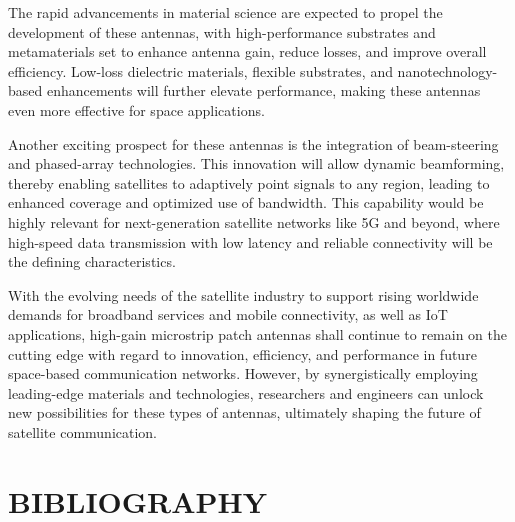 \documentclass[12pt]{article}
\begin{document}
\par The rapid advancements in material science are expected to propel the development of these antennas, with high-performance substrates and metamaterials set to enhance antenna gain, reduce losses, and improve overall efficiency. Low-loss dielectric materials, flexible substrates, and nanotechnology-based enhancements will further elevate performance, making these antennas even more effective for space applications.\\

\newpage
\par Another exciting prospect for these antennas is the integration of beam-steering and phased-array technologies. This innovation will allow dynamic beamforming, thereby enabling satellites to adaptively point signals to any region, leading to enhanced coverage and optimized use of bandwidth. This capability would be highly relevant for next-generation satellite networks like 5G and beyond, where high-speed data transmission with low latency and reliable connectivity will be the defining characteristics.\\

\par With the evolving needs of the satellite industry to support rising worldwide demands for broadband services and mobile connectivity, as well as IoT applications, high-gain microstrip patch antennas shall continue to remain on the cutting edge with regard to innovation, efficiency, and performance in future space-based communication networks. However, by synergistically employing leading-edge materials and technologies, researchers and engineers can unlock new possibilities for these types of antennas, ultimately shaping the future of satellite communication.\\



\newpage
\section{BIBLIOGRAPHY}
\end{document}
